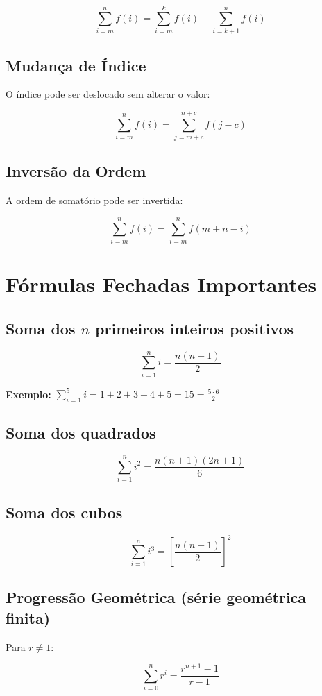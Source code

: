 \documentclass[12pt, a4paper]{article}
\begin{document}
\[
\sum_{i=m}^{n} f(i) = \sum_{i=m}^{k} f(i) + \sum_{i=k+1}^{n} f(i)
\]

\subsection{Mudança de Índice}
O índice pode ser deslocado sem alterar o valor:

\[
\sum_{i=m}^{n} f(i) = \sum_{j=m+c}^{n+c} f(j - c)
\]

\subsection{Inversão da Ordem}
A ordem de somatório pode ser invertida:

\[
\sum_{i=m}^{n} f(i) = \sum_{i=m}^{n} f(m + n - i)
\]

\section{Fórmulas Fechadas Importantes}

\subsection{Soma dos $n$ primeiros inteiros positivos}

\[
\sum_{i=1}^{n} i = \frac{n(n+1)}{2}
\]

\textbf{Exemplo:} $\displaystyle\sum_{i=1}^{5} i = 1 + 2 + 3 + 4 + 5 = 15 = \frac{5 \cdot 6}{2}$

\subsection{Soma dos quadrados}

\[
\sum_{i=1}^{n} i^2 = \frac{n(n+1)(2n+1)}{6}
\]

\subsection{Soma dos cubos}

\[
\sum_{i=1}^{n} i^3 = \left[\frac{n(n+1)}{2}\right]^2
\]

\subsection{Progressão Geométrica (série geométrica finita)}
Para $r \neq 1$:

\[
\sum_{i=0}^{n} r^i = \frac{r^{n+1} - 1}{r - 1}
\]
\end{document}
